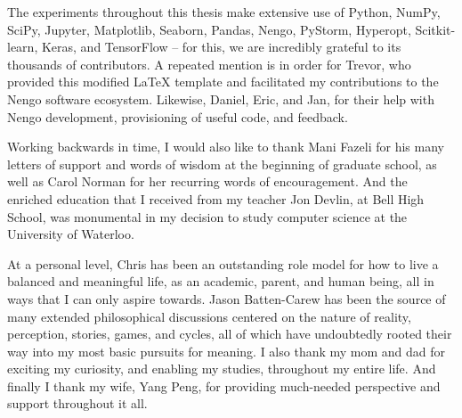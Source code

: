 \newpage

The experiments throughout this thesis make extensive use of Python, NumPy, SciPy, Jupyter, Matplotlib, Seaborn, Pandas, Nengo, PyStorm, Hyperopt, Scitkit-learn, Keras, and TensorFlow -- for this, we are incredibly grateful to its thousands of contributors.
A repeated mention is in order for Trevor, who provided this modified \LaTeX{} template and facilitated my contributions to the Nengo software ecosystem.
Likewise, Daniel, Eric, and Jan, for their help with Nengo development, provisioning of useful code, and feedback.

Working backwards in time, I would also like to thank Mani Fazeli for his many letters of support and words of wisdom at the beginning of graduate school, as well as Carol Norman for her recurring words of encouragement.
And the enriched education that I received from my teacher Jon Devlin, at Bell High School, was monumental in my decision to study computer science at the University of Waterloo.

At a personal level, Chris has been an outstanding role model for how to live a balanced and meaningful life, as an academic, parent, and human being, all in ways that I can only aspire towards.
Jason Batten-Carew has been the source of many extended philosophical discussions centered on the nature of reality, perception, stories, games, and cycles, all of which have undoubtedly rooted their way into my most basic pursuits for meaning.
I also thank my mom and dad for exciting my curiosity, and enabling my studies, throughout my entire life.
And finally I thank my wife, Yang Peng, for providing much-needed perspective and support throughout it all.

\cleardoublepage
